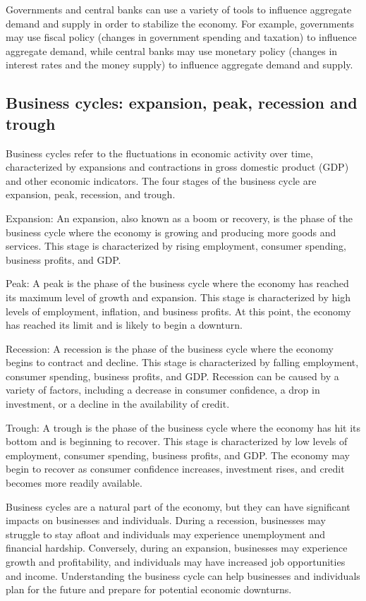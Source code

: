 \documentclass[12pt, a4paper, oneside]{article}
\begin{document}
Governments and central banks can use a variety of tools to influence aggregate demand and supply in order to stabilize the economy. For example, governments may use fiscal policy (changes in government spending and taxation) to influence aggregate demand, while central banks may use monetary policy (changes in interest rates and the money supply) to influence aggregate demand and supply.
\subsection{ Business cycles: expansion, peak, recession and trough }
Business cycles refer to the fluctuations in economic activity over time, characterized by expansions and contractions in gross domestic product (GDP) and other economic indicators. The four stages of the business cycle are expansion, peak, recession, and trough.

Expansion: An expansion, also known as a boom or recovery, is the phase of the business cycle where the economy is growing and producing more goods and services. This stage is characterized by rising employment, consumer spending, business profits, and GDP.

Peak: A peak is the phase of the business cycle where the economy has reached its maximum level of growth and expansion. This stage is characterized by high levels of employment, inflation, and business profits. At this point, the economy has reached its limit and is likely to begin a downturn.

Recession: A recession is the phase of the business cycle where the economy begins to contract and decline. This stage is characterized by falling employment, consumer spending, business profits, and GDP. Recession can be caused by a variety of factors, including a decrease in consumer confidence, a drop in investment, or a decline in the availability of credit.

Trough: A trough is the phase of the business cycle where the economy has hit its bottom and is beginning to recover. This stage is characterized by low levels of employment, consumer spending, business profits, and GDP. The economy may begin to recover as consumer confidence increases, investment rises, and credit becomes more readily available.

Business cycles are a natural part of the economy, but they can have significant impacts on businesses and individuals. During a recession, businesses may struggle to stay afloat and individuals may experience unemployment and financial hardship. Conversely, during an expansion, businesses may experience growth and profitability, and individuals may have increased job opportunities and income. Understanding the business cycle can help businesses and individuals plan for the future and prepare for potential economic downturns.
\end{document}
